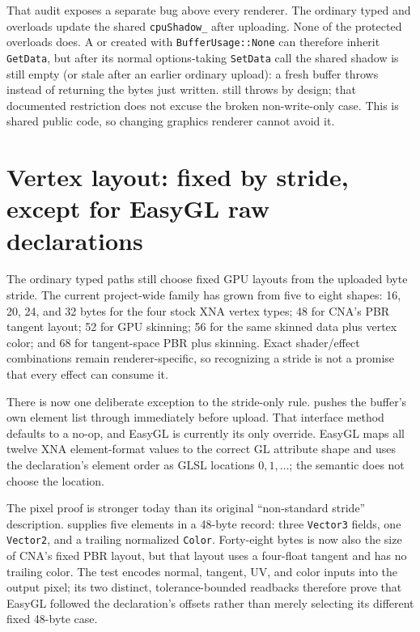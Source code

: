 That audit exposes a separate bug above every renderer. The ordinary typed
 and  overloads update the shared
\texttt{cpuShadow\_} after uploading. None of the protected
 overloads does. A  or
 created with \texttt{BufferUsage::None} can therefore inherit
\texttt{GetData}, but after its normal options-taking \texttt{SetData} call the shared shadow
is still empty (or stale after an earlier ordinary upload): a fresh buffer throws
 instead of returning the bytes just written.
 still throws  by design; that
documented restriction does not excuse the broken non-write-only case. This is shared public
code, so changing graphics renderer cannot avoid it.

\section{Vertex layout: fixed by stride, except for EasyGL raw declarations}
\label{sec:vertex-layout}

The ordinary typed paths still choose fixed GPU layouts from the uploaded byte stride. The
current project-wide family has grown from five to eight shapes: 16, 20, 24, and 32 bytes for
the four stock XNA vertex types; 48 for CNA's PBR tangent layout; 52 for GPU skinning; 56 for
the same skinned data plus vertex color; and 68 for tangent-space PBR plus skinning. Exact
shader/effect combinations remain renderer-specific, so recognizing a stride is not a promise
that every effect can consume it.

There is now one deliberate exception to the stride-only rule.
 pushes the buffer's own
 element list through
 immediately before upload. That
interface method defaults to a no-op, and EasyGL is currently its only override. EasyGL maps
all twelve XNA element-format values to the correct GL attribute shape and uses the
declaration's element order as GLSL locations \(0,1,\ldots\); the semantic
 does not choose the location.

The pixel proof is stronger today than its original ``non-standard stride'' description.
 supplies five elements in a
48-byte record: three \texttt{Vector3} fields, one \texttt{Vector2}, and a trailing normalized
\texttt{Color}. Forty-eight bytes is now also the size of CNA's fixed PBR layout, but that
layout uses a four-float tangent and has no trailing color. The test encodes normal, tangent,
UV, and color inputs into the output pixel; its two distinct, tolerance-bounded readbacks
therefore prove that EasyGL followed the declaration's offsets rather than merely selecting
its different fixed 48-byte case.


